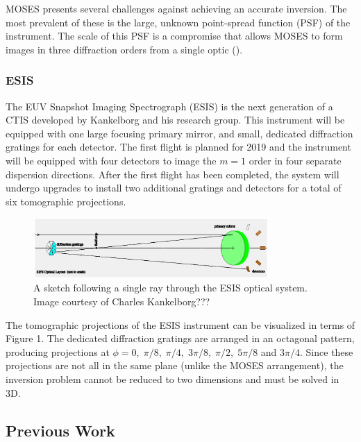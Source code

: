 \documentclass{article}
\begin{document}
				MOSES presents several challenges against achieving an accurate inversion. The most prevalent of these is the large, unknown point-spread function (PSF) of the instrument. The scale of this PSF is a compromise that allows MOSES to form images in three diffraction orders from a single optic (\cite{kankel1}).

			\subsubsection{ESIS}
			
				The EUV Snapshot Imaging Spectrograph (ESIS) is the next generation of a CTIS developed by Kankelborg and his research group. This instrument will be equipped with one large focusing primary mirror, and small, dedicated diffraction gratings for each detector. The first flight is planned for 2019 and the instrument will be equipped with four detectors to image the $m=1$ order in four separate dispersion directions. After the first flight has been completed, the system will undergo upgrades to install two additional gratings and detectors for a total of six tomographic projections. 
				\begin{figure}[h!]
					\centering
					\includegraphics[width=0.8\textwidth]{figures/esis}
					\caption{A sketch following a single ray through the ESIS optical system. Image courtesy of Charles Kankelborg???}
					\label{esis_sketch}
				\end{figure}
				
				The tomographic projections of the ESIS instrument can be visualized in terms of Figure 1. The dedicated diffraction gratings are arranged in an octagonal pattern, producing projections at $\phi = 0, \; \pi/8, \; \pi/4, \; 3 \pi / 8, \; \pi /2, \; 5 \pi /8$ and $3 \pi /4$. Since these projections are not all in the same plane (unlike the MOSES arrangement), the inversion problem cannot be reduced to two dimensions and must be solved in 3D.
			
		\subsection{Previous Work}
			\label{pwork}
			
\end{document}

